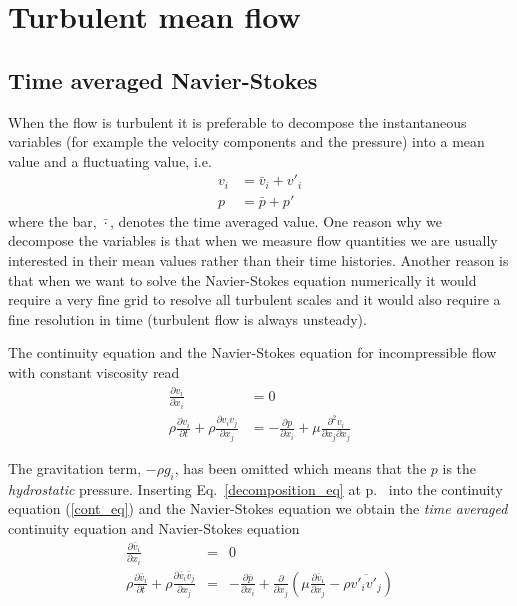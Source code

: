 \documentclass[a4paper]{article}
\def\D{\partial}
\def\vb{\bar{v}}
\def\pb{\bar{p}}
\def\vij{\overline{v'_iv'_j}}
\begin{document}
\section{Turbulent mean flow}

\subsection{Time averaged Navier-Stokes}

When the flow is turbulent it is preferable to decompose
the instantaneous variables (for example the velocity components and
the pressure) into a mean value and a fluctuating value, i.e.
%
\begin{equation}
\label{decomposition_eq}
\begin{split}
v_i &= \vb_i + v'_i \\
p &= \pb + p'
\end{split}
\end{equation}
%
where the bar, $\bar{\cdot}$, denotes the time averaged value.
One reason why we decompose the variables is that
when we measure flow quantities we are usually interested
in their mean values rather than their time histories.
Another reason is that when we want to solve the Navier-Stokes
equation
numerically it would require a very fine grid to resolve all turbulent
scales and it would also require a fine resolution in time (turbulent
flow is always unsteady). 

The continuity equation and the Navier-Stokes equation for  incompressible flow  with constant
viscosity read
%
\begin{equation}
\label{cont_eq}
\begin{split}
\frac{\D v_i}{\D x_i} &= 0\\
\rho \frac{\D v_{i}}{\D t} + \rho \frac{\D v_i v_j}{\D x_j} &=
- \frac{\D p}{\D x_i} + \mu \frac{\D^2 v_i}{\D x_j\D x_j}
\end{split}
\end{equation}
%

The gravitation term, $-\rho g_i$, has been omitted which means that the $p$ is the \emph{hydrostatic}
pressure.
Inserting Eq.~\ref{decomposition_eq} at p.~\pageref{decomposition_eq} into the continuity equation
(\ref{cont_eq}) and the Navier-Stokes equation we obtain
the \emph{time averaged} continuity equation and Navier-Stokes
equation
%
\begin{eqnarray}
\label{cont_time_eq}
\frac{\D  \vb_i}{\D x_i} &=& 0\\
\label{NS_time_eq}
\rho \frac{\D \vb_{i}}{\D t} + \rho \frac{\D \vb_i \vb_j}{\D x_j} &=&
- \frac{\D \pb}{\D x_i} + \frac{\D}{\D x_j}\left(\mu \frac{\D \vb_i}{\D x_j} - \rho \vij \right)
\end{eqnarray}
\end{document}
